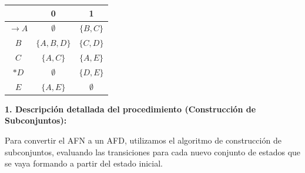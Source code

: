 \documentclass[12pt]{article}
\begin{document}
\begin{center}
\begin{tabular}{c|cc}
& 0 & 1 \\
\hline
$\rightarrow A$ & $\emptyset$ & $\{B,C\}$ \\
$B$ & $\{A,B,D\}$ & $\{C,D\}$ \\
$C$ & $\{A,C\}$ & $\{A,E\}$ \\
$*D$ & $\emptyset$ & $\{D,E\}$ \\
$E$ & $\{A,E\}$ & $\emptyset$ \\
\end{tabular}
\end{center}

\vspace{0.5cm}

\textbf{1. Descripción detallada del procedimiento (Construcción de Subconjuntos):}

Para convertir el AFN a un AFD, utilizamos el algoritmo de construcción de subconjuntos, evaluando las transiciones para cada nuevo conjunto de estados que se vaya formando a partir del estado inicial.
\end{document}
